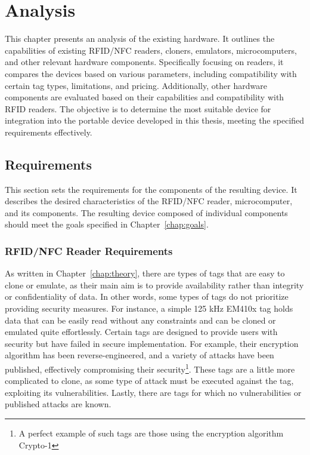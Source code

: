 \chapter{Analysis}
\label{chap:analysis}

This chapter presents an analysis of the existing hardware. It outlines the capabilities of existing RFID/NFC readers, cloners, emulators, microcomputers, and other relevant hardware components. Specifically focusing on readers, it compares the devices based on various parameters, including compatibility with certain tag types, limitations, and pricing. Additionally, other hardware components are evaluated based on their capabilities and compatibility with RFID readers. The objective is to determine the most suitable device for integration into the portable device developed in this thesis, meeting the specified requirements effectively.


\section{Requirements}
\label{sec:requirements}

This section sets the requirements for the components of the resulting device. It describes the desired characteristics of the RFID/NFC reader, microcomputer, and its components. The resulting device composed of individual components should meet the goals specified in Chapter~\ref{chap:goals}.

\subsection{RFID/NFC Reader Requirements}

As written in Chapter~\ref{chap:theory}, there are types of tags that are easy to clone or emulate, as their main aim is to provide availability rather than integrity or confidentiality of data. In other words, some types of tags do not prioritize providing security measures. For instance, a simple 125 kHz EM410x tag holds data that can be easily read without any constraints and can be cloned or emulated quite effortlessly. Certain tags are designed to provide users with security but have failed in secure implementation. For example, their encryption algorithm has been reverse-engineered, and a variety of attacks have been published, effectively compromising their security\footnote{A perfect example of such tags are those using the encryption algorithm Crypto-1}. These tags are a little more complicated to clone, as some type of attack must be executed against the tag, exploiting its vulnerabilities. Lastly, there are tags for which no vulnerabilities or published attacks are known.

